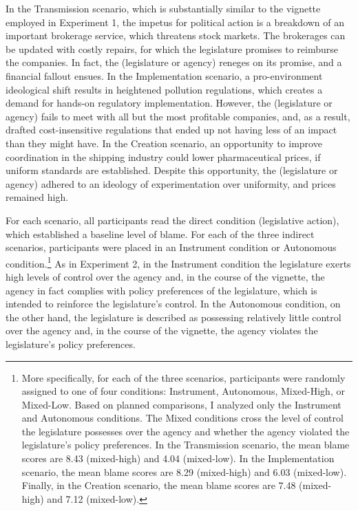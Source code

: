 \documentclass{article}
\begin{document}
In the Transmission scenario, which is substantially similar to the vignette employed in Experiment 1, the impetus for political action is a breakdown of an important brokerage service, which threatens stock markets. The brokerages can be updated with costly repairs, for which the legislature promises to reimburse the companies. In fact, the (legislature or agency) reneges on its promise, and a financial fallout ensues. In the Implementation scenario, a pro-environment ideological shift results in heightened pollution regulations, which creates a demand for hands-on regulatory implementation. However, the (legislature or agency) fails to meet with all but the most profitable companies, and, as a result, drafted cost-insensitive regulations that ended up not having less of an impact than they might have. In the Creation scenario, an opportunity to improve coordination in the shipping industry could lower pharmaceutical prices, if uniform standards are established. Despite this opportunity, the (legislature or agency) adhered to an ideology of experimentation over uniformity, and prices remained high. 

For each scenario, all participants read the direct condition (legislative action), which established a baseline level of blame. For each of the three indirect scenarios, participants were placed in an Instrument condition or Autonomous condition.\footnote{More specifically, for each of the three scenarios, participants were randomly assigned to one of four conditions: Instrument, Autonomous, Mixed-High, or Mixed-Low. Based on planned comparisons, I analyzed only the Instrument and Autonomous conditions. The Mixed conditions cross the level of control the legislature possesses over the agency and whether the agency violated the legislature's policy preferences. In the Transmission scenario, the mean blame scores are 8.43 (mixed-high) and 4.04 (mixed-low). In the Implementation scenario, the mean blame scores are 8.29 (mixed-high) and 6.03 (mixed-low). Finally, in the Creation scenario, the mean blame scores are 7.48 (mixed-high) and 7.12 (mixed-low).} As in Experiment 2, in the Instrument condition the legislature exerts high levels of control over the agency and, in the course of the vignette, the agency in fact complies with policy preferences of the legislature, which is intended to reinforce the legislature's control. In the Autonomous condition, on the other hand, the legislature is described as possessing relatively little control over the agency and, in the course of the vignette, the agency violates the legislature's policy preferences. 
\end{document}
